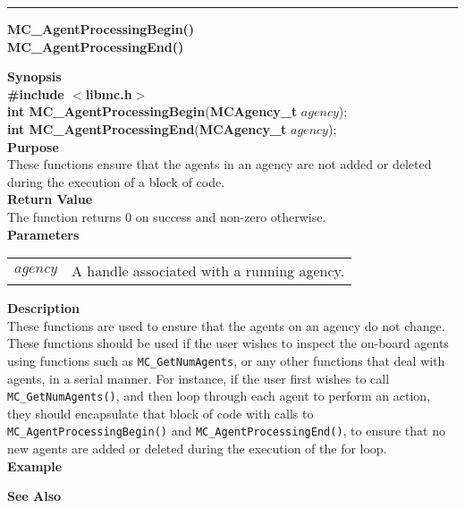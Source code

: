 \noindent
\vspace{5pt}
\rule{6.5in}{0.015in}
\noindent
{\LARGE \bf MC\_AgentProcessingBegin()}\\
{\LARGE \bf MC\_AgentProcessingEnd()}\\
{}

\noindent
{\bf Synopsis}\\
{\bf \#include $<$libmc.h$>$}\\
{\bf int MC\_AgentProcessingBegin}({\bf MCAgency\_t} $agency$);\\
{\bf int MC\_AgentProcessingEnd}({\bf MCAgency\_t} $agency$);\\

\noindent
{\bf Purpose}\\
These functions ensure that the agents in an agency are not added or deleted
during the execution of a block of code.\\

\noindent
{\bf Return Value}\\
The function returns 0 on success and non-zero otherwise.\\

\noindent
{\bf Parameters}
\vspace{-0.1in}
\begin{description}
\item               
\begin{tabular}{p{10 mm}p{145 mm}}
$agency$ & A handle associated with a running agency. 
\end{tabular}
\end{description}

\noindent
{\bf Description}\\
These functions are used to ensure that the agents on an agency do not change.
These functions should be used if the user wishes to inspect the on-board
agents using functions such as \texttt{MC\_GetNumAgents}, or any other
functions that deal with agents, in a serial manner. For instance, if the user
first wishes to call \texttt{MC\_GetNumAgents()}, and then loop through each
agent to perform an action, they should encapsulate that block of code with
calls to \texttt{MC\_AgentProcessingBegin()} and
\texttt{MC\_AgentProcessingEnd()}, to ensure that no new agents are added or
deleted during the execution of the for loop.\\

\noindent
{\bf Example}\\
\noindent
{\footnotesize}

\noindent
{\bf See Also}\\

